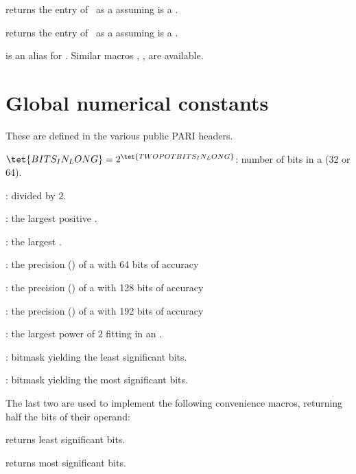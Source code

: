  returns the  entry of~ as
a  assuming  is a .

 returns the  entry of~ as
a  assuming  is a .

 is an alias for .
Similar macros , ,  are available.

\section{Global numerical constants}
These are defined in the various public PARI headers.


\noindent {} $\tet{BITS_IN_LONG} = 2^{\tet{TWOPOTBITS_IN_LONG}}$:
number of bits in a  (32 or 64).

\noindent {} :  divided by
$2$.

\noindent {} : the largest positive .

\noindent {} : the largest .

\noindent {} :    the precision () of a
 with 64 bits of accuracy

\noindent {} : the precision () of a
 with 128 bits of accuracy

\noindent {} : the precision () of a
 with 192 bits of accuracy

\noindent {} : the largest power of $2$ fitting in an
.

\noindent {} : bitmask yielding the least significant
bits.

\noindent {} : bitmask yielding the most significant
bits.

\noindent The last two are used to implement the following convenience macros,
returning half the bits of their operand:

 returns least significant bits.

 returns most significant bits.

